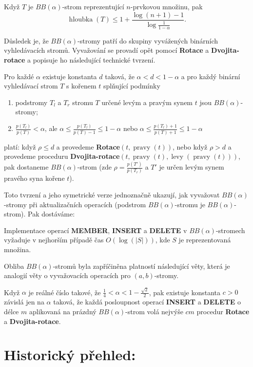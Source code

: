 \documentclass[a4paper,12pt]{article}
\DeclareMathOperator*{\levy}{levy}
\DeclareMathOperator*{\pravy}{pravy}
\DeclareMathOperator*{\hloubka}{hloubka}
\begin{document}
Když $T$ je $BB(\alpha )$-strom reprezentující 
$n$-prvkovou množinu, pak 
$$\hloubka(T)\le 1+\frac {\log(n+1)-1}{\log\frac 1{1-\alpha}}.$$
\endproclaim

Důsledek je, že $BB(\alpha )$-stromy patří do 
skupiny vyvážených binárních vyhledávacích 
stro\-mů.  Vyvažování se provadí opět pomocí 
{\bf Rotace} a {\bf Dvojita-rotace} a popisuje ho následu\-jí\-cí 
technické tvrzení. 

Pro každé $\alpha$ existuje konstanta $
d$ 
taková, že $\alpha <d<1-\alpha$ a pro každý binární vyhledávací 
strom $T$ s kořenem $t$ splňující podmínky
\begin{enumerate}
\item
podstromy $T_l$ a $T_r$ stromu $T$ určené levým a pravým 
synem $t$ jsou $BB(\alpha )$-stromy;
\item
$\frac {p(T_l)}{p(T)}<\alpha$, ale $\alpha\le\frac {
p(T_l)}{p(T)-1}\le 1-\alpha$ nebo $\alpha\le\frac {
p(T_l)+1}{p(T)+1}\le 1-\alpha$
\end{enumerate}
platí:\newline 
když $\rho\le d$ a provedeme {\bf Rotace$(t,\pravy(t))$}, nebo když 
$\rho >d$ a provedeme proceduru {\bf Dvojita-rotace$(t,\pravy(t),\levy(\pravy(t)))$}, pak dostaneme 
$BB(\alpha )$-strom (zde $\rho =\frac {p(T')}{p(T_r
)}$ a $T'$ je určen levým synem 
pravé\-ho syna kořene $t$).  
\endproclaim

Toto tvrzení a jeho symetrické verze jednoznačně ukazují, 
jak vyvažovat $BB(\alpha )$-stromy při aktualizačních 
operacích (podstrom $BB(\alpha )$-stromu je $BB(\alpha )$-strom). Pak dostáváme:

Implementace operací {\bf MEMBER}, {\bf INSERT} a {\bf DELETE }v $BB(\alpha )$-stromech vyžaduje v nejhorším 
případě čas $O(\log(|S|))$, kde $S$ je 
reprezentovaná množina.
\endproclaim

Obliba $BB(\alpha )$-stromů byla zapříčiněna 
platností následující věty, která je analogií věty o 
vyvažovacích operacích pro $(a,b)$-stromy.

Když $\alpha$ je reálné číslo takové, že 
$\frac 14<\alpha <1-\frac {\sqrt 2}2$, pak existuje konstanta $c>
0$ závislá jen na 
$\alpha$ taková, že každá posloupnost operací {\bf INSERT} a {\bf DELETE }
o délce $m$ aplikovaná na prázdný $BB(\alpha )$-strom volá 
nejvýše $cm$ procedur {\bf Rotace} a {\bf Dvojita-rotace}.
\endproclaim

\section{Historický přehled:}
\end{document}

